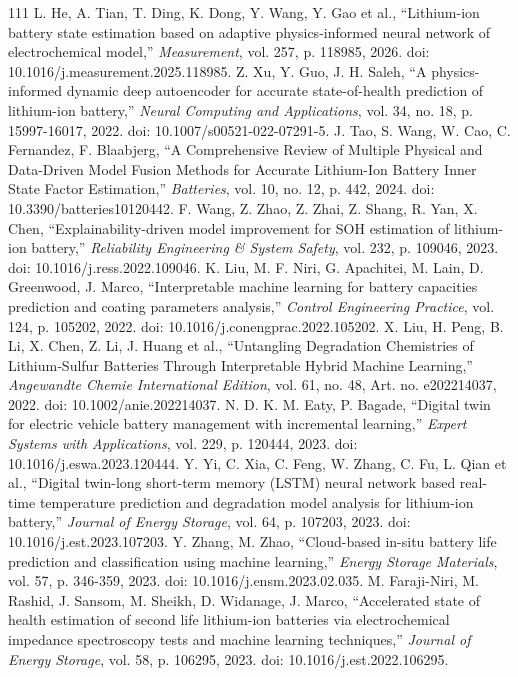 \documentclass[journal]{IEEEtran}
\begin{document}
\begin{thebibliography}{111}
L. He, A. Tian, T. Ding, K. Dong, Y. Wang, Y. Gao et al., ``Lithium-ion battery state estimation based on adaptive physics-informed neural network of electrochemical model,'' \emph{Measurement}, vol. 257, p. 118985, 2026. doi: 10.1016/j.measurement.2025.118985.
Z. Xu, Y. Guo, J. H. Saleh, ``A physics-informed dynamic deep autoencoder for accurate state-of-health prediction of lithium-ion battery,'' \emph{Neural Computing and Applications}, vol. 34, no. 18, p. 15997-16017, 2022. doi: 10.1007/s00521-022-07291-5.
J. Tao, S. Wang, W. Cao, C. Fernandez, F. Blaabjerg, ``A Comprehensive Review of Multiple Physical and Data-Driven Model Fusion Methods for Accurate Lithium-Ion Battery Inner State Factor Estimation,'' \emph{Batteries}, vol. 10, no. 12, p. 442, 2024. doi: 10.3390/batteries10120442.
F. Wang, Z. Zhao, Z. Zhai, Z. Shang, R. Yan, X. Chen, ``Explainability-driven model improvement for SOH estimation of lithium-ion battery,'' \emph{Reliability Engineering \& System Safety}, vol. 232, p. 109046, 2023. doi: 10.1016/j.ress.2022.109046.
K. Liu, M. F. Niri, G. Apachitei, M. Lain, D. Greenwood, J. Marco, ``Interpretable machine learning for battery capacities prediction and coating parameters analysis,'' \emph{Control Engineering Practice}, vol. 124, p. 105202, 2022. doi: 10.1016/j.conengprac.2022.105202.
X. Liu, H. Peng, B. Li, X. Chen, Z. Li, J. Huang et al., ``Untangling Degradation Chemistries of Lithium‐Sulfur Batteries Through Interpretable Hybrid Machine Learning,'' \emph{Angewandte Chemie International Edition}, vol. 61, no. 48, Art. no. e202214037, 2022. doi: 10.1002/anie.202214037.
N. D. K. M. Eaty, P. Bagade, ``Digital twin for electric vehicle battery management with incremental learning,'' \emph{Expert Systems with Applications}, vol. 229, p. 120444, 2023. doi: 10.1016/j.eswa.2023.120444.
Y. Yi, C. Xia, C. Feng, W. Zhang, C. Fu, L. Qian et al., ``Digital twin-long short-term memory (LSTM) neural network based real-time temperature prediction and degradation model analysis for lithium-ion battery,'' \emph{Journal of Energy Storage}, vol. 64, p. 107203, 2023. doi: 10.1016/j.est.2023.107203.
Y. Zhang, M. Zhao, ``Cloud-based in-situ battery life prediction and classification using machine learning,'' \emph{Energy Storage Materials}, vol. 57, p. 346-359, 2023. doi: 10.1016/j.ensm.2023.02.035.
M. Faraji-Niri, M. Rashid, J. Sansom, M. Sheikh, D. Widanage, J. Marco, ``Accelerated state of health estimation of second life lithium-ion batteries via electrochemical impedance spectroscopy tests and machine learning techniques,'' \emph{Journal of Energy Storage}, vol. 58, p. 106295, 2023. doi: 10.1016/j.est.2022.106295.

\end{thebibliography}
\end{document}

